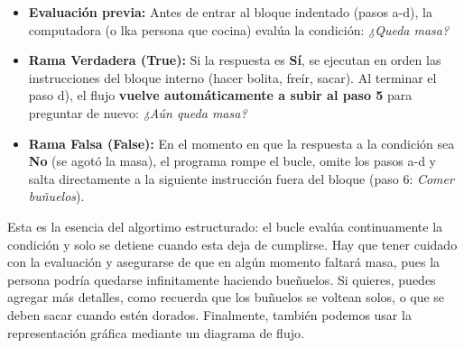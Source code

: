 \documentclass[12pt]{article}
\begin{document}
\begin{itemize}
    \item \textbf{Evaluación previa:} Antes de entrar al bloque indentado 
    (pasos a-d), la computadora (o lka persona que cocina) 
    evalúa la condición: \textit{¿Queda masa?}
    \item \textbf{Rama Verdadera (True):} Si la respuesta es \textbf{Sí}, se ejecutan en orden las instrucciones del bloque interno (hacer bolita, freír, sacar). Al terminar el paso d), el flujo \textbf{vuelve automáticamente a subir al paso 5} para preguntar de nuevo: \textit{¿Aún queda masa?}
    \item \textbf{Rama Falsa (False):} En el momento en que la respuesta a la condición sea \textbf{No} (se agotó la masa), el programa rompe el bucle, omite los pasos a-d y salta directamente a la siguiente instrucción fuera del bloque (paso 6: \textit{Comer buñuelos}).
\end{itemize}

Esta es la esencia del algortimo estructurado: el bucle evalúa 
continuamente la condición y solo se detiene cuando esta deja de cumplirse.
Hay que tener cuidado
con la evaluación y asegurarse de que en algún momento faltará masa, pues la 
persona podría quedarse infinitamente haciendo bueñuelos.
Si quieres, puedes agregar más detalles, como recuerda que los buñuelos 
se voltean solos, o que se deben sacar cuando estén dorados. 
Finalmente, también podemos usar la representación gráfica mediante un 
diagrama de flujo.  

\begin{center}
\end{center}
\end{document}
